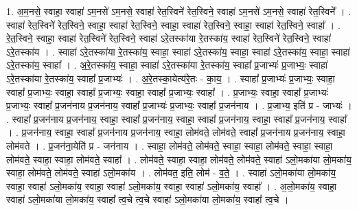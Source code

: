 \documentclass[17pt]{extarticle}
\begin{document}
1. अ॒म॒नसे॒ स्वाहा॒ स्वाहा॑ ऽम॒नसे॑ ऽम॒नसे॒ स्वाहा॑ रेत॒स्विने॑ रेत॒स्विने॒ स्वाहा॑ ऽम॒नसे॑ ऽम॒नसे॒ स्वाहा॑ रेत॒स्विने᳚ । . स्वाहा॑ रेत॒स्विने॑ रेत॒स्विने॒ स्वाहा॒ स्वाहा॑ रेत॒स्विने॒ स्वाहा॒ स्वाहा॑ रेत॒स्विने॒ स्वाहा॒ स्वाहा॑ रेत॒स्विने॒ स्वाहा᳚ । . रे॒त॒स्विने॒ स्वाहा॒ स्वाहा॑ रेत॒स्विने॑ रेत॒स्विने॒ स्वाहा॑ ऽरे॒तस्का॑या रे॒तस्का॑य॒ स्वाहा॑ रेत॒स्विने॑ रेत॒स्विने॒ स्वाहा॑ ऽरे॒तस्का॑य । . स्वाहा॑ ऽरे॒तस्का॑या रे॒तस्का॑य॒ स्वाहा॒ स्वाहा॑ ऽरे॒तस्का॑य॒ स्वाहा॒ स्वाहा॑ ऽरे॒तस्का॑य॒ स्वाहा॒ स्वाहा॑ ऽरे॒तस्का॑य॒ स्वाहा᳚ । . अ॒रे॒तस्का॑य॒ स्वाहा॒ स्वाहा॑ ऽरे॒तस्का॑या रे॒तस्का॑य॒ स्वाहा᳚ प्र॒जाभ्यः॑ प्र॒जाभ्यः॒ स्वाहा॑ ऽरे॒तस्का॑या रे॒तस्का॑य॒ स्वाहा᳚ प्र॒जाभ्यः॑ । . अ॒रे॒तस्का॒येत्य॑रे॒तः - का॒य॒ । . स्वाहा᳚ प्र॒जाभ्यः॑ प्र॒जाभ्यः॒ स्वाहा॒ स्वाहा᳚ प्र॒जाभ्यः॒ स्वाहा॒ स्वाहा᳚ प्र॒जाभ्यः॒ स्वाहा॒ स्वाहा᳚ प्र॒जाभ्यः॒ स्वाहा᳚ । . प्र॒जाभ्यः॒ स्वाहा॒ स्वाहा᳚ प्र॒जाभ्यः॑ प्र॒जाभ्यः॒ स्वाहा᳚ प्र॒जन॑नाय प्र॒जन॑नाय॒ स्वाहा᳚ प्र॒जाभ्यः॑ प्र॒जाभ्यः॒ स्वाहा᳚ प्र॒जन॑नाय । . प्र॒जाभ्य॒ इति॑ प्र - जाभ्यः॑ । . स्वाहा᳚ प्र॒जन॑नाय प्र॒जन॑नाय॒ स्वाहा॒ स्वाहा᳚ प्र॒जन॑नाय॒ स्वाहा॒ स्वाहा᳚ प्र॒जन॑नाय॒ स्वाहा॒ स्वाहा᳚ प्र॒जन॑नाय॒ स्वाहा᳚ । . प्र॒जन॑नाय॒ स्वाहा॒ स्वाहा᳚ प्र॒जन॑नाय प्र॒जन॑नाय॒ स्वाहा॒ लोम॑वते॒ लोम॑वते॒ स्वाहा᳚ प्र॒जन॑नाय प्र॒जन॑नाय॒ स्वाहा॒ लोम॑वते । . प्र॒जन॑ना॒येति॑ प्र - जन॑नाय । . स्वाहा॒ लोम॑वते॒ लोम॑वते॒ स्वाहा॒ स्वाहा॒ लोम॑वते॒ स्वाहा॒ स्वाहा॒ लोम॑वते॒ स्वाहा॒ स्वाहा॒ लोम॑वते॒ स्वाहा᳚ । . लोम॑वते॒ स्वाहा॒ स्वाहा॒ लोम॑वते॒ लोम॑वते॒ स्वाहा॑ ऽलो॒मका॑या लो॒मका॑य॒ स्वाहा॒ लोम॑वते॒ लोम॑वते॒ स्वाहा॑ ऽलो॒मका॑य । . लोम॑वत॒ इति॒ लोम॑ - व॒ते॒ । . स्वाहा॑ ऽलो॒मका॑या लो॒मका॑य॒ स्वाहा॒ स्वाहा॑ ऽलो॒मका॑य॒ स्वाहा॒ स्वाहा॑ ऽलो॒मका॑य॒ स्वाहा॒ स्वाहा॑ ऽलो॒मका॑य॒ स्वाहा᳚ । . अ॒लो॒मका॑य॒ स्वाहा॒ स्वाहा॑ ऽलो॒मका॑या लो॒मका॑य॒ स्वाहा᳚ त्व॒चे त्व॒चे स्वाहा॑ ऽलो॒मका॑या लो॒मका॑य॒ स्वाहा᳚ त्व॒चे । \newline
\end{document}
